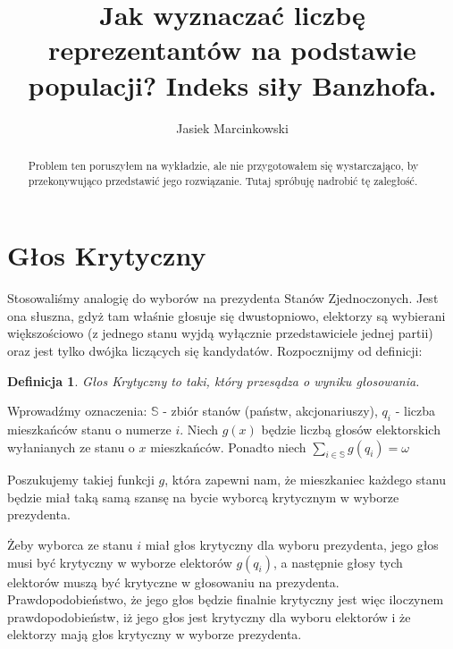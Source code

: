 \documentclass[9pt, letterpaper, notitlepage]{article}
\title{Jak wyznaczać liczbę reprezentantów na podstawie populacji? Indeks siły Banzhofa.}
\author{Jasiek Marcinkowski}
\newtheorem{mydef}{Definicja}
\begin{document}
	\maketitle
	\thispagestyle{empty}
	\begin{abstract}
		Problem ten poruszyłem na wykładzie, ale nie przygotowałem się wystarczająco, by przekonywująco przedstawić jego rozwiązanie. Tutaj spróbuję nadrobić tę zaległość.
	\end{abstract}
	
	\section{Głos Krytyczny}
		Stosowaliśmy analogię do wyborów na prezydenta Stanów Zjednoczonych. Jest ona słuszna, gdyż tam właśnie głosuje się dwustopniowo, elektorzy są wybierani większościowo (z jednego stanu wyjdą wyłącznie przedstawiciele jednej partii) oraz jest tylko dwójka liczących się kandydatów.
		Rozpocznijmy od definicji:
		\begin{mydef}
			Głos Krytyczny to taki, który przesądza o wyniku głosowania.
		\end{mydef}
		Wprowadźmy oznaczenia: $\mathbb{S}$ - zbiór stanów (państw, akcjonariuszy), $q_i$ - liczba mieszkańców stanu o numerze $i$.
		Niech $g(x)$ będzie liczbą głosów elektorskich wyłanianych ze stanu o $x$ mieszkańców. Ponadto niech $\sum\limits_{i \in \mathbb{S}}{g(q_i)}  = \omega$
		
		Poszukujemy takiej funkcji $g$, która zapewni nam, że mieszkaniec każdego stanu będzie miał taką samą szansę na bycie wyborcą krytycznym w wyborze prezydenta. 
		
		Żeby wyborca ze stanu $i$ miał głos krytyczny dla wyboru prezydenta, jego głos musi być krytyczny w wyborze elektorów $g(q_i)$, a następnie głosy tych elektorów muszą być krytyczne w głosowaniu na prezydenta. Prawdopodobieństwo, że jego głos będzie finalnie krytyczny jest więc iloczynem prawdopodobieństw, iż jego głos jest krytyczny dla wyboru elektorów i że elektorzy mają głos krytyczny w wyborze prezydenta.
\end{document}
